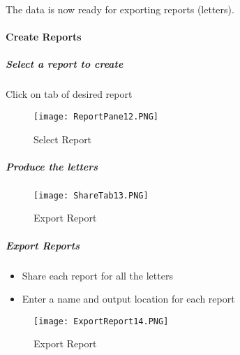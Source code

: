 \noindent The data is now ready for exporting reports (letters).

\clearpage


\paragraph{Create Reports}

\subparagraph{Select a report to create}
\vspace{.5in}

\noindent Click on tab of desired report

\vspace{1in}


\begin{figure}[h!]
 \centering
     \texttt{[image: ReportPane12.PNG]}
 \caption{Select Report}


 \end{figure}


\clearpage

\subparagraph{Produce the letters}
\vspace{.5in}


\begin{figure}[h!]
 \centering
     \texttt{[image: ShareTab13.PNG]}
 \caption{Export Report}


 \end{figure} 


\clearpage

\subparagraph{Export Reports}

\begin{itemize}

\item Share each report for all the letters

\item Enter a name and output location for each report

\end{itemize}



\begin{figure}[h!]
 \centering
     \texttt{[image: ExportReport14.PNG]}
 \caption{Export Report}


 \end{figure} 


